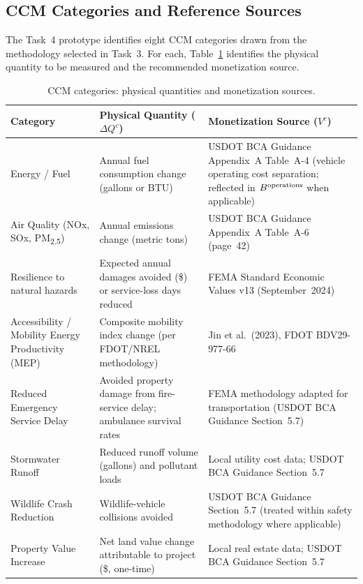 \subsection{CCM Categories and Reference Sources}

The Task~4 prototype identifies eight CCM categories drawn from the
methodology selected in Task~3. For each, Table~\ref{tab:ccm-sources}
identifies the physical quantity to be measured and the recommended
monetization source.

\begin{table}[H]
\centering
\caption{CCM categories: physical quantities and monetization sources.}
\label{tab:ccm-sources}
\small
\begin{tabular}{p{3.4cm}p{4.0cm}p{6.6cm}}
\toprule
\textbf{Category} & \textbf{Physical Quantity ($\Delta Q^c$)} & \textbf{Monetization Source ($V^c$)} \\
\midrule
Energy / Fuel & Annual fuel consumption change (gallons or BTU) & USDOT BCA Guidance Appendix~A Table~A-4 (vehicle operating cost separation; reflected in $B^{\mathrm{operations}}$ when applicable) \\
\addlinespace
Air Quality (NOx, SOx, PM\textsubscript{2.5}) & Annual emissions change (metric tons) & USDOT BCA Guidance Appendix~A Table~A-6 (page~42) \\
\addlinespace
Resilience to natural hazards & Expected annual damages avoided (\$) or service-loss days reduced & FEMA Standard Economic Values v13 (September~2024) \\
\addlinespace
Accessibility / Mobility Energy Productivity (MEP) & Composite mobility index change (per FDOT/NREL methodology) & Jin et al.~(2023), FDOT BDV29-977-66 \\
\addlinespace
Reduced Emergency Service Delay & Avoided property damage from fire-service delay; ambulance survival rates & FEMA methodology adapted for transportation (USDOT BCA Guidance Section~5.7) \\
\addlinespace
Stormwater Runoff & Reduced runoff volume (gallons) and pollutant loads & Local utility cost data; USDOT BCA Guidance Section~5.7 \\
\addlinespace
Wildlife Crash Reduction & Wildlife-vehicle collisions avoided & USDOT BCA Guidance Section~5.7 (treated within safety methodology where applicable) \\
\addlinespace
Property Value Increase & Net land value change attributable to project (\$, one-time) & Local real estate data; USDOT BCA Guidance Section~5.7 \\
\bottomrule
\end{tabular}
\end{table}

